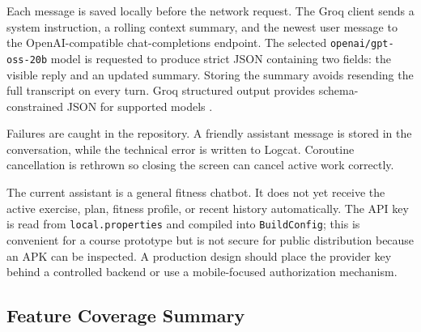 Each message is saved locally before the network request. The Groq client sends a system instruction, a rolling context summary, and the newest user message to the OpenAI-compatible chat-completions endpoint. The selected \texttt{openai/gpt-oss-20b} model is requested to produce strict JSON containing two fields: the visible reply and an updated summary. Storing the summary avoids resending the full transcript on every turn. Groq structured output provides schema-constrained JSON for supported models \cite{groqstructured}.

Failures are caught in the repository. A friendly assistant message is stored in the conversation, while the technical error is written to Logcat. Coroutine cancellation is rethrown so closing the screen can cancel active work correctly.

The current assistant is a general fitness chatbot. It does not yet receive the active exercise, plan, fitness profile, or recent history automatically. The API key is read from \texttt{local.properties} and compiled into \texttt{BuildConfig}; this is convenient for a course prototype but is not secure for public distribution because an APK can be inspected. A production design should place the provider key behind a controlled backend or use a mobile-focused authorization mechanism.

\subsection{Feature Coverage Summary}

